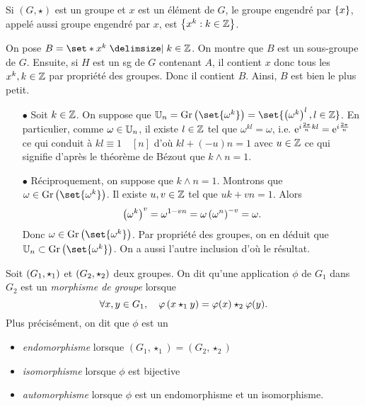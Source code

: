 \documentclass{magnolia}
\begin{document}
\begin{remarqueUnique}
\remarque Si $(G,\star)$ est un groupe et $x$ est un élément de $G$, le
  groupe engendré par $\left\{x\right\}$, appelé aussi groupe engendré par $x$,
  est $\left\{x^k : k\in\mathbb{Z}\right\}$.
\end{remarqueUnique}
\begin{sol}
On pose $B=\enstq{x^k}{k\in\Z}$. On montre que $B$ est un sous-groupe de $G$. Ensuite, si $H$ est un sg de $G$ contenant $A$, il contient $x$ donc tous les $x^k, k\in \mathbb{Z}$ par propriété des groupes. Donc il contient $B$. Ainsi, $B$ est bien le plus petit.
\end{sol}



\begin{sol}
\begin{itemize}
$\U[n]=\set{\omega^r, r\in \Z}=\set{\omega^r, r\in \intere{0}{n-1}}$
\item[$\bullet$] Soit $k\in\mathbb{Z}$. On suppose que $\U[n]={\rm Gr}\p{\set{\omega^k}}=\set{\p{\omega^k}^l, l\in\Z}$. En particulier, comme $\omega \in \U[n]$, il existe $l\in\mathbb{Z}$ tel que $\omega^{kl}=\omega$, i.e. ${\rm e}^{i\frac{2\pi}{n}kl}={\rm e}^{i\frac{2\pi}{n}}$ ce qui conduit à $kl\equiv 1\quad [n]$ d'où $kl+(-u)n=1$ avec $u\in \mathbb{Z}$ ce qui signifie d'après le théorème de Bézout que $k\wedge n=1$.
\item[$\bullet$] Réciproquement, on suppose que $k\wedge n=1$. Montrons que $\omega \in {\rm Gr}\p{\set{\omega^k}}$. Il existe $u,v \in \mathbb{Z}$ tel que $uk+vn=1$. Alors $$\left(\omega^k\right)^v=\omega^{1-vn}=\omega \left(\omega^n\right)^{-v}=\omega.$$ Donc $\omega \in {\rm Gr}\p{\set{\omega^k}}$. Par propriété des groupes, on en déduit que $\U[n]\subset {\rm Gr}\p{\set{\omega^k}}$. On a aussi l'autre inclusion d'où le résultat.
\end{itemize}
\end{sol}

\begin{definition}
Soit $\left(G_1,\star_1\right)$ et $\left(G_2,\star_2\right)$ deux groupes. On dit qu'une
application $\phi$ de $G_1$ dans $G_2$ est un \emph{morphisme de groupe} lorsque
\[\forall x,y\in G_1 ,\quad \varphi\left(x\star_1 y\right)=\varphi(x)\star_2\varphi(y).\]
Plus précisément, on dit que $\phi$ est un
\begin{itemize}
\item \emph{endomorphisme} lorsque $(G_1,\star_1)=(G_2,\star_2)$
\item \emph{isomorphisme} lorsque $\phi$ est bijective
\item \emph{automorphisme} lorsque $\phi$ est un endomorphisme et un isomorphisme.
\end{itemize}
\end{definition}
\end{document}
